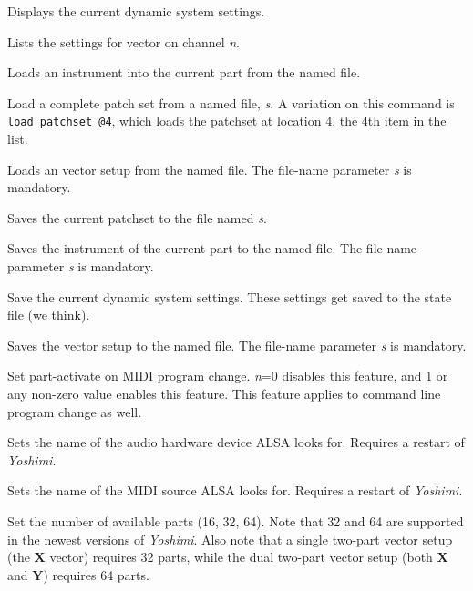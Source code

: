       Displays the current dynamic system settings.

      Lists the settings for vector on channel \textsl{n}.

      Loads an instrument into the current part from the named file.

      Load a complete patch set from a named file, \textsl{s}.
      A variation on this command is \texttt{load patchset @4}, which
      loads the patchset at location 4, the 4th item in the list.

      Loads an vector setup from the named file.
      The file-name parameter \textsl{s} is mandatory.

      Saves the current patchset to the file named \textsl{s}.

      Saves the instrument of the current part to the named file.
      The file-name parameter \textsl{s} is mandatory.

      Save the current dynamic system settings.
      These settings get saved to the state file (we think).

      Saves the vector setup to the named file.
      The file-name parameter \textsl{s} is mandatory.

      Set part-activate on MIDI program change.
      \textsl{n}=0 disables this feature, and
      1 or any non-zero value enables this feature.
      This feature applies to command line program change as well.

      Sets the name of the audio hardware device ALSA looks for.
      Requires a restart of \textsl{Yoshimi}.

      Sets the name of the MIDI source ALSA looks for.
      Requires a restart of \textsl{Yoshimi}.

      Set the number of available parts (16, 32, 64).
      Note that 32 and 64 are supported in the newest versions of
      \textsl{Yoshimi}.  Also note that a single two-part vector setup (the
      \textbf{X} vector) requires 32 parts, while the dual two-part vector
      setup (both \textbf{X} and \textbf{Y}) requires 64 parts.

